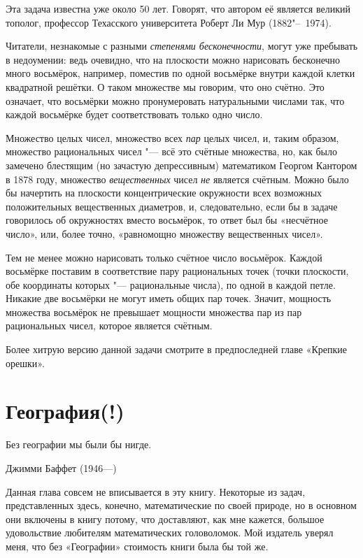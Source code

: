 \documentclass[twoside]{book}
\begin{document}
Эта задача известна уже около 50 лет.
Говорят, что автором её является великий тополог, профессор Техасского университета Роберт Ли Мур (1882"--~1974). %

Читатели, незнакомые с разными \emph{степенями бесконечности}, могут уже пребывать в недоумении: ведь очевидно, что на плоскости можно нарисовать бесконечно много восьмёрок, например, поместив по одной восьмёрке внутри каждой клетки квадратной решётки.
О таком множестве мы говорим, что оно счётно. 
Это означает, что восьмёрки можно пронумеровать натуральными числами так, что каждой восьмёрке будет соответствовать только одно число.

\medskip

Множество целых чисел, множество всех \emph{пар} целых чисел, и, таким образом, множество рациональных чисел "--- всё это счётные множества, но, как было замечено блестящим (но зачастую депрессивным) математиком Георгом Кантором в 1878 году, множество \emph{вещественных} чисел \emph{не} является счётным.
Можно было бы начертить на плоскости концентрические окружности всех возможных положительных вещественных диаметров, и, следовательно, если бы в задаче говорилось об окружностях вместо восьмёрок, то ответ был бы «несчётное число», или, более точно, «равномощно множеству вещественных чисел».

Тем не менее можно нарисовать только счётное число восьмёрок.
Каждой восьмёрке поставим в соответствие пару рациональных точек (точки плоскости, обе координаты которых "--- рациональные числа), по одной в каждой петле.
Никакие две восьмёрки не могут иметь общих пар точек.
Значит, мощность множества восьмёрок не превышает мощности множества пар из пар рациональных чисел, которое является счётным.\heart

Более хитрую версию данной задачи смотрите в предпоследней главе «Крепкие орешки».

\chapter{География(!)}

\setlength{\epigraphwidth}{.4\textwidth}
\epigraph{Без географии мы были бы нигде.\vspace{1ex}}{Джимми Баффет (1946---)} 

Данная глава совсем не вписывается в эту книгу.
Некоторые из задач, представленных здесь, конечно, математические по своей природе, %
но в основном они включены в книгу потому, что доставляют, как мне кажется, большое удовольствие любителям математических головоломок.
Мой издатель уверял меня, что без «Географии» стоимость книги была бы той же.
\end{document}
